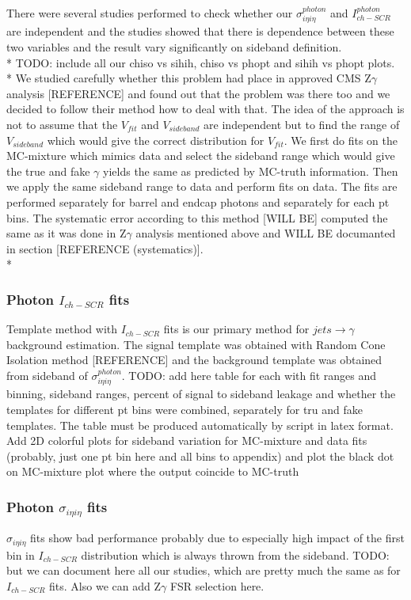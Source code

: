 There were several studies performed to check whether our $\sigma_{i \eta i \eta}^{photon}$ and $I_{ch-SCR}^{photon}$ are independent and the studies showed that there is dependence between these two variables and the result vary significantly on sideband definition. \\*
TODO: include all our chiso vs sihih, chiso vs phopt and sihih vs phopt plots.\\*
We studied carefully whether this problem had place in approved CMS Z$\gamma$ analysis [REFERENCE] and found out that the problem was there too and we decided to follow their method how to deal with that. The idea of the approach is not to assume that the  $V_{fit}$ and $V_{sideband}$ are independent but to find the range of $V_{sideband}$ which would give the correct distribution for $V_{fit}$. We first do fits on the MC-mixture which mimics data and select the sideband range which would give the true and fake $\gamma$ yields the same as predicted by MC-truth information. Then we apply the same sideband range to data and perform fits on data. The fits are performed separately for barrel and endcap photons and separately for each pt bins. The systematic error according to this method [WILL BE] computed the same as it was done in Z$\gamma$ analysis mentioned above and WILL BE documanted in section [REFERENCE (systematics)].\\*

\subsubsection{Photon $I_{ch-SCR}$ fits}
Template method with $I_{ch-SCR}$ fits is our primary method for $jets \rightarrow \gamma$ background estimation. The signal template was obtained with Random Cone Isolation method [REFERENCE] and the background template was obtained from sideband of $\sigma_{i \eta i \eta}^{photon}$.
TODO: add here table for each with fit ranges and binning, sideband ranges, percent of signal to sideband leakage and whether the templates for different pt bins were combined, separately for tru and fake templates. The table must be produced automatically by script in latex format. Add 2D colorful plots for sideband variation for MC-mixture and data fits (probably, just one pt bin here and all bins to appendix) and plot the black dot on MC-mixture plot where the output coincide to MC-truth 

\subsubsection{Photon $\sigma_{i \eta i \eta}$ fits}
$\sigma_{i \eta i \eta}$ fits show bad performance probably due to especially high impact of the first bin in $I_{ch-SCR}$ distribution which is always thrown from the sideband. TODO: but we can document here all our studies, which are pretty much the same as for $I_{ch-SCR}$ fits. Also we can add Z$\gamma$ FSR selection here.

